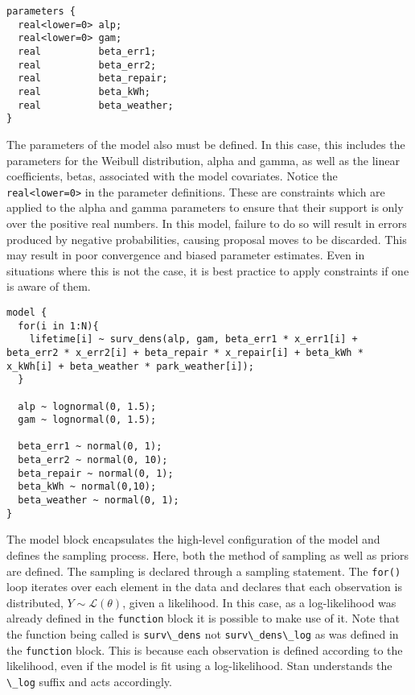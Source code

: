 \begin{lstlisting}
parameters {
  real<lower=0> alp;
  real<lower=0> gam;
  real          beta_err1;
  real          beta_err2;
  real          beta_repair;
  real          beta_kWh;
  real          beta_weather;
}
\end{lstlisting}


The parameters of the model also must be defined. In this case, this includes the parameters for the Weibull distribution, alpha and gamma, as well as the linear coefficients, betas, associated with the model covariates. Notice the \lstinline{real<lower=0>} in the parameter definitions. These are constraints which are applied to the alpha and gamma parameters to ensure that their support is only over the positive real numbers. In this model, failure to do so will result in errors produced by negative probabilities, causing proposal moves to be discarded. This may result in poor convergence and biased parameter estimates. Even in situations where this is not the case, it is best practice to apply constraints if one is aware of them.


\begin{lstlisting}
model {
  for(i in 1:N){
    lifetime[i] ~ surv_dens(alp, gam, beta_err1 * x_err1[i] + beta_err2 * x_err2[i] + beta_repair * x_repair[i] + beta_kWh * x_kWh[i] + beta_weather * park_weather[i]);
  }

  alp ~ lognormal(0, 1.5);
  gam ~ lognormal(0, 1.5);
  
  beta_err1 ~ normal(0, 1);
  beta_err2 ~ normal(0, 10);
  beta_repair ~ normal(0, 1);
  beta_kWh ~ normal(0,10);
  beta_weather ~ normal(0, 1);
}
\end{lstlisting}


The model block encapsulates the high-level configuration of the model and defines the sampling process. Here, both the method of sampling as well as priors are defined. The sampling is declared through a sampling statement. The \lstinline{for()} loop iterates over each element in the data and declares that each observation is distributed, $Y \sim \mathcal {L}(\theta)$,  given a likelihood. In this case, as a log-likelihood was already defined in the \lstinline{function} block it is possible to make use of it. Note that the function being called is \lstinline{surv\_dens} not \lstinline{surv\_dens\_log} as was defined in the \lstinline{function} block. This is because each observation is defined according to the likelihood, even if the model is fit using a log-likelihood. Stan understands the \lstinline{\_log} suffix and acts accordingly. 


